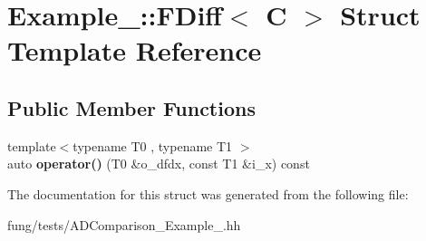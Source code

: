 \hypertarget{structExample__5_1_1FDiff}{\section{Example\-\_\-:\-:F\-Diff$<$ C $>$ Struct Template Reference}
\label{structExample__5_1_1FDiff}
}
\subsection*{Public Member Functions}
\begin{DoxyCompactItemize}
\item 
\hypertarget{structExample__5_1_1FDiff_aefb29923f0a8b9f3b0f9a52dae41b4bb}{{\footnotesize template$<$typename T0 , typename T1 $>$ }\\auto {\bfseries operator()} (T0 \&o\-\_\-dfdx, const T1 \&i\-\_\-x) const }\label{structExample__5_1_1FDiff_aefb29923f0a8b9f3b0f9a52dae41b4bb}

\end{DoxyCompactItemize}


The documentation for this struct was generated from the following file\-:\begin{DoxyCompactItemize}
\item 
fung/tests/A\-D\-Comparison\-\_\-\-Example\-\_.\-hh\end{DoxyCompactItemize}

